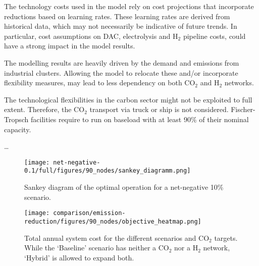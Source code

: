 \documentclass[twocolumn]{article}
\newcommand{\carbon}{CO$_2$}
\newcommand{\hydrogen}{H$_2$}
\begin{document}
The technology costs used in the model rely on cost projections that incorporate reductions based on learning rates. These learning rates are derived from historical data, which may not necessarily be indicative of future trends. In particular, cost assumptions on DAC, electrolysis and \hydrogen{} pipeline costs, could have a strong impact in the model results.

The modelling results are heavily driven by the demand and emissions from industrial clusters. Allowing the model to relocate these and/or incorporate flexibility measures, may lead to less dependency on both \carbon{} and \hydrogen{} networks.

The technological flexibilities in the carbon sector might not be exploited to full extent. Therefore, the \carbon{} transport via truck or ship is not considered. Fischer-Tropsch facilities require to run on baseload with at least 90\% of their nominal capacity.

\dots





\printbibliography

\appendix


\begin{figure*}
    \centering
    \texttt{[image: net-negative-0.1/full/figures/90\_nodes/sankey\_diagramm.png]}
    \caption{Sankey diagram of the optimal operation for a net-negative 10\% scenario.}
    \label{fig:sankey_diagramm}
\end{figure*}

\begin{figure}
    \centering
    \texttt{[image: comparison/emission-reduction/figures/90\_nodes/objective\_heatmap.png]}
    \caption{Total annual system cost for the different scenarios and \carbon{} targets. While the `Baseline' scenario has neither a \carbon{} nor a \hydrogen{} network, `Hybrid' is allowed to expand both.}
    \label{fig:objective_heatmap}
\end{figure}
\end{document}
